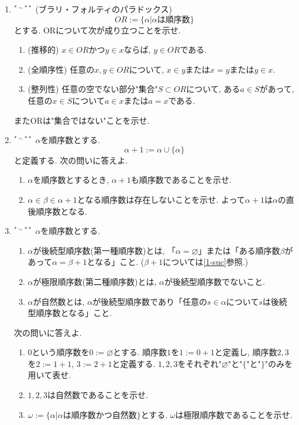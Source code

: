 \documentclass[dvipdfmx,a4paper,11pt]{article}
\theoremstyle{definition}
\begin{document}
\begin{enumerate}[label=\textbf{問}\ref*{sec-1}.\arabic*]
 \newpage 
 \item \label{1-OR} $^{* \sim **}$ (ブラリ・フォルティのパラドックス)
 $$
 OR := \{ \alpha | \text{$\alpha$は順序数}\}
 $$
 とする. ORについて次が成り立つことを示せ.
 \begin{enumerate}[label=(\alph*).]
 \setlength{\parskip}{0cm}
  \setlength{\itemsep}{0pt}
\item (推移的) $x \in OR$かつ$y \in x$ならば, $y \in OR$である. 
\item (全順序性) 任意の$x,y \in OR$について, $x \in y$または$x=y$または$y \in x$.
\item  (整列性) 任意の空でない部分"集合"$S \subset OR$について, ある$a\in S$があって, 任意の$x \in S$について$a \in x$または$a=x$である.
  \end{enumerate}
またORは"集合ではない"ことを示せ. 

\item $^{* \sim **}$ \label{1-suc}$\alpha$を順序数とする. 
 $$
 \alpha +1:= \alpha \cup \{ \alpha \}
 $$
 と定義する. 次の問いに答えよ. 
   \begin{enumerate}[label=(\arabic*).]
 \setlength{\parskip}{0cm}
  \setlength{\itemsep}{0pt}
  \item $\alpha$を順序数とするとき, $\alpha +1$も順序数であることを示せ.
  \item $\alpha \in \beta \in \alpha+1$となる順序数は存在しないことを示せ. よって$\alpha+1$は$\alpha$の直後順序数となる. 
  \end{enumerate}
  
\item \label{1-natural} $^{* \sim **}$ $\alpha$を順序数とする. 
\begin{enumerate}[label=(\alph*).]
 \setlength{\parskip}{0cm}
  \setlength{\itemsep}{0pt}
\item $\alpha$が後続型順序数(第一種順序数)とは, 「$\alpha=\varnothing$」または「ある順序数$\beta$があって$\alpha=\beta+1$となる」こと. ($\beta+1$については\ref{1-suc}参照.)
\item $\alpha$が極限順序数(第二種順序数)とは, $\alpha$が後続型順序数でないこと. 
\item $\alpha$が自然数とは, $\alpha$が後続型順序数であり「任意の$s \in \alpha$について$s$は後続型順序数となる」こと.
  \end{enumerate}
次の問いに答えよ.
   \begin{enumerate}[label=(\arabic*).]
 \setlength{\parskip}{0cm}
  \setlength{\itemsep}{0pt}
  \item $0$という順序数を$0:=\varnothing$とする. 
  順序数$1$を$1:=0+1$と定義し, 順序数$2,3$を$2:=1+1$, $3 := 2+1$と定義する. 
  $1,2,3$をそれぞれ"$\varnothing$"と"$\{$"と"$\}$"のみを用いて表せ.
  \item $1,2,3$は自然数であることを示せ.
  \item $\omega:= \{ \alpha | \text{$\alpha$は順序数かつ自然数}\}$とする. $\omega$は極限順序数であることを示せ. 
  \end{enumerate}


\end{enumerate}
\end{document}
